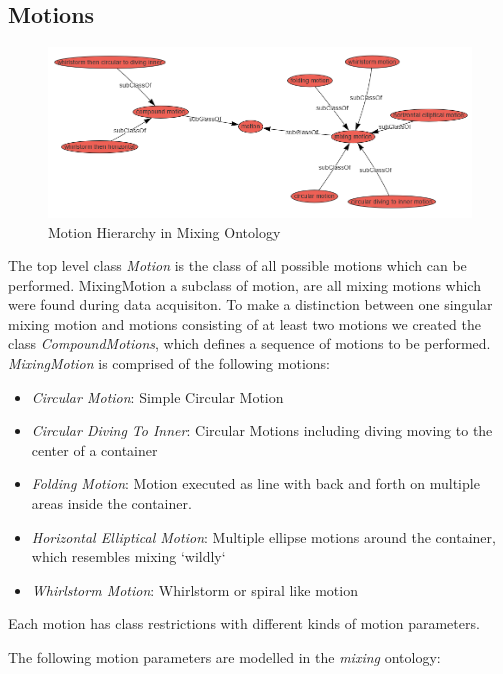 \subsection{Motions}
\begin{figure}[H]
    \includegraphics[scale=0.45]{Graphics/classHierarchy/motions_hierarchy.png}
    \centering
    \caption{Motion Hierarchy in Mixing Ontology}
\end{figure}

The top level class \textit{Motion} is the class of all possible motions which can be performed. MixingMotion a subclass of motion, are all mixing motions 
which were found during data acquisiton. To make a distinction between one singular mixing motion and motions consisting of at least two motions
we created the class \textit{CompoundMotions}, which defines a sequence of motions to be performed.
\textit{MixingMotion} is comprised of the following motions:

\begin{itemize}
    \item \textit{Circular Motion}: Simple Circular Motion
    \item \textit{Circular Diving To Inner}: Circular Motions including diving moving to the center of a container
    \item \textit{Folding Motion}: Motion executed as line with back and forth on multiple areas inside the container.
    \item \textit{Horizontal Elliptical Motion}: Multiple ellipse motions around the container, which resembles mixing `wildly`
    \item \textit{Whirlstorm Motion}: Whirlstorm or spiral like motion
\end{itemize}

Each motion has class restrictions with different kinds of motion parameters.

The following motion parameters are modelled in the \textit{mixing} ontology:

